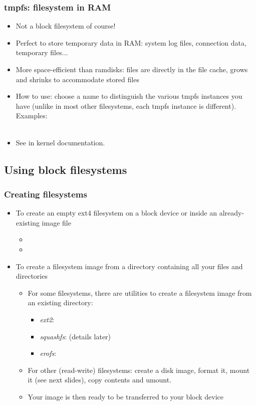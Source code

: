 \begin{frame}
  \frametitle{tmpfs: filesystem in RAM}
  \begin{itemize}
  \item Not a block filesystem of course!
  \item Perfect to store temporary data in RAM: system log files,
    connection data, temporary files...
  \item More space-efficient than ramdisks: files are directly in the
    file cache, grows and shrinks to accommodate stored files
  \item How to use: choose a name to distinguish the various tmpfs
    instances you have (unlike in most other filesystems, each
    tmpfs instance is different). Examples:\\
    \\
  \item See  in kernel documentation.
  \end{itemize}
\end{frame}

\subsection{Using block filesystems}

\begin{frame}
  \frametitle{Creating filesystems}
  \begin{itemize}
  \item To create an empty ext4 filesystem on a block device or
    inside an already-existing image file
    \begin{itemize}
    \item {}
    \item {}
    \end{itemize}
  \item To create a filesystem image from a directory containing all
    your files and directories
    \begin{itemize}
    \item For some filesystems, there are utilities to create a
          filesystem image from an existing directory:
          \begin{itemize}
          \item {\em ext2}: 
	      \item {\em squashfs}:  (details later)
          \item {\em erofs}: 
          \end{itemize}
    \item For other (read-write) filesystems: create a disk image,
          format it, mount it (see next slides), copy contents and umount.
    \item Your image is then ready to be transferred to your block device
    \end{itemize}
  \end{itemize}
\end{frame}

